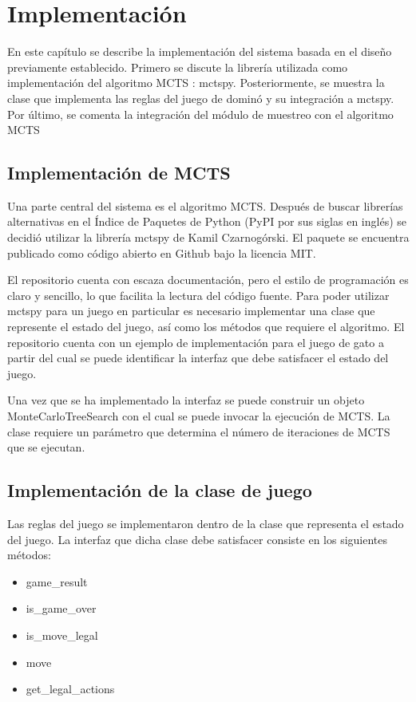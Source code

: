 \chapter{Implementación}

\noindent

En este capítulo se describe la implementación del sistema basada en el diseño
previamente establecido. Primero se discute la librería utilizada como
implementación del algoritmo MCTS : mctspy. Posteriormente, se muestra la clase
que implementa las reglas del juego de dominó y su integración a mctspy. Por
último, se comenta la integración del módulo de muestreo con el algoritmo MCTS

\section{Implementación de MCTS}

Una parte central del sistema es el algoritmo MCTS. Después de buscar librerías
alternativas en el Índice de Paquetes de Python (PyPI por sus siglas en inglés)
se decidió utilizar la librería mctspy de Kamil Czarnogórski. El paquete se
encuentra publicado como código abierto en Github bajo la licencia MIT.

El repositorio cuenta con escaza documentación, pero el estilo de programación
es claro y sencillo, lo que facilita la lectura del código fuente. Para poder
utilizar mctspy para un juego en particular es necesario implementar una clase
que represente el estado del juego, así como los métodos que requiere el
algoritmo. El repositorio cuenta con un ejemplo de implementación para el juego
de gato a partir del cual se puede identificar la interfaz que debe satisfacer
el estado del juego.

Una vez que se ha implementado la interfaz se puede construir un objeto
MonteCarloTreeSearch con el cual se puede invocar la ejecución de MCTS. La clase
requiere un parámetro que determina el número de iteraciones de MCTS que se
ejecutan.

\section{Implementación de la clase de juego}

Las reglas del juego se implementaron dentro de la clase que representa el
estado del juego. La interfaz que dicha clase debe satisfacer consiste en los
siguientes métodos:

\begin{itemize}
   \item game\_result
   \item is\_game\_over
   \item is\_move\_legal
   \item move
   \item get\_legal\_actions
\end{itemize}

